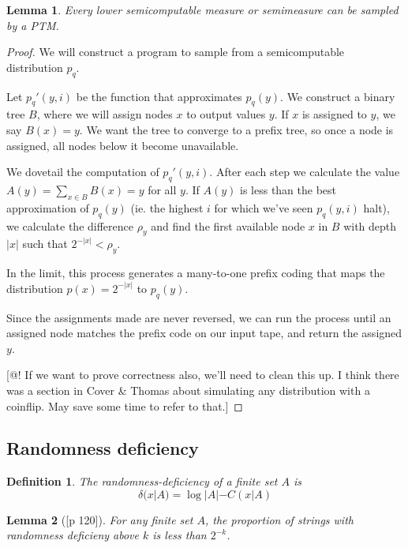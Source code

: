 \documentclass[10pt,a4paper,oneside]{article}
\newtheorem{lma}{Lemma}
\newtheorem{dfn}{Definition}
\begin{document}
\begin{lma}
Every lower semicomputable measure or semimeasure can be sampled by a PTM.
\end{lma}
\begin{proof}
We will construct a program to sample from a semicomputable distribution $p_q$. 

Let $p_q'(y, i)$ be the function that approximates $p_q(y)$. We construct a binary tree $B$, where we will assign nodes $x$ to output values $y$. If $x$ is assigned to $y$, we say $B(x) = y$. We want the tree to converge to a prefix tree, so once a node is assigned, all nodes below it become unavailable. 

We dovetail the computation of $p_q'(y, i)$. After each step we calculate the value $A(y) = \sum_{x \in B} B(x) = y$ for all $y$. If $A(y)$ is less than the best approximation of $p_q(y)$ (ie. the highest $i$ for which we've seen $p_q(y, i)$ halt), we calculate the difference $\rho_y$ and find the first available node $x$ in $B$ with depth $|x|$ such that $2^{-|x|} < \rho_y$.

In the limit, this process generates a many-to-one prefix coding that maps the distribution $p(x) = 2^{-|x|}$ to $p_q(y)$.

Since the assignments made are never reversed, we can run the process until an assigned node matches the prefix code on our input tape, and return the assigned $y$.
  
[@! If we want to prove correctness also, we'll need to clean this up. I think there was a section in Cover \& Thomas about simulating any distribution with a coinflip. May save some time to refer to that.]
\end{proof}

\subsection*{Randomness deficiency}

\begin{dfn}
The randomness-deficiency of a finite set $A$ is 
\[
\delta(x|A) = \log |A| - C(x|A)
\]
\end{dfn}

\begin{lma}[{\cite{li1993introduction}[p 120]}]
For any finite set $A$, the proportion of strings with randomness deficieny above $k$ is less than $2^{-k}$. 

\label{lma:rd-finitesets}
\end{lma}
\end{document}
